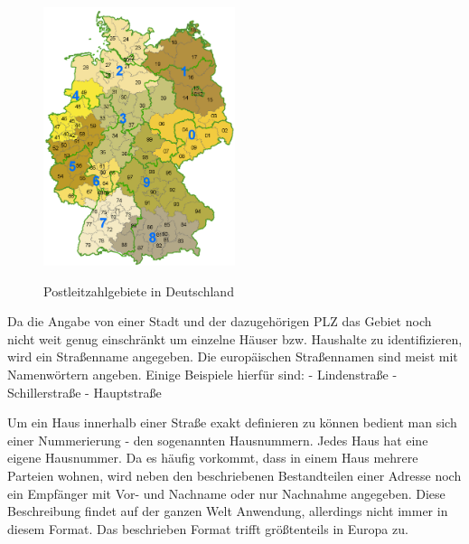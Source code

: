 \begin{figure}
  \centering
    \includegraphics[width=0.50\textwidth]{ref/images/plzgebiete.png}
   \caption{Postleitzahlgebiete in Deutschland}
  \label{fig:Postleitzahlgebiete}
   \cite{PLZGebiete}
\end{figure}



Da die Angabe von einer Stadt und der dazugehörigen PLZ das Gebiet noch nicht weit genug einschränkt um einzelne Häuser bzw. Haushalte zu identifizieren, wird ein Straßenname angegeben.
Die europäischen Straßennamen sind meist mit Namenwörtern angeben.
Einige Beispiele hierfür sind:
-	Lindenstraße
-	Schillerstraße
-	Hauptstraße

Um ein Haus innerhalb einer Straße exakt definieren zu können bedient man sich einer Nummerierung - den sogenannten Hausnummern. Jedes Haus hat eine eigene Hausnummer. 
Da es häufig vorkommt, dass in einem Haus mehrere Parteien wohnen, wird neben den beschriebenen Bestandteilen einer Adresse noch ein Empfänger mit Vor- und Nachname oder nur Nachnahme angegeben.
Diese Beschreibung findet auf der ganzen Welt Anwendung, allerdings nicht immer in diesem Format. Das beschrieben Format trifft größtenteils in Europa zu. 

